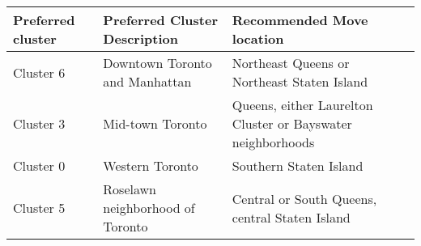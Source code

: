 \documentclass[11pt]{article}
\begin{document}
\begin{longtable}[]{@{}lll@{}}
\toprule
\begin{minipage}[b]{0.22\columnwidth}\raggedright\strut
Preferred cluster\strut
\end{minipage} & \begin{minipage}[b]{0.22\columnwidth}\raggedright\strut
Preferred Cluster Description\strut
\end{minipage} & \begin{minipage}[b]{0.22\columnwidth}\raggedright\strut
Recommended Move location\strut
\end{minipage}\tabularnewline
\midrule
\endhead
\begin{minipage}[t]{0.22\columnwidth}\raggedright\strut
Cluster 6\strut
\end{minipage} & \begin{minipage}[t]{0.22\columnwidth}\raggedright\strut
Downtown Toronto and Manhattan\strut
\end{minipage} & \begin{minipage}[t]{0.22\columnwidth}\raggedright\strut
Northeast Queens or Northeast Staten Island\strut
\end{minipage}\tabularnewline
\begin{minipage}[t]{0.22\columnwidth}\raggedright\strut
Cluster 3\strut
\end{minipage} & \begin{minipage}[t]{0.22\columnwidth}\raggedright\strut
Mid-town Toronto\strut
\end{minipage} & \begin{minipage}[t]{0.22\columnwidth}\raggedright\strut
Queens, either Laurelton Cluster or Bayswater neighborhoods\strut
\end{minipage}\tabularnewline
\begin{minipage}[t]{0.22\columnwidth}\raggedright\strut
Cluster 0\strut
\end{minipage} & \begin{minipage}[t]{0.22\columnwidth}\raggedright\strut
Western Toronto\strut
\end{minipage} & \begin{minipage}[t]{0.22\columnwidth}\raggedright\strut
Southern Staten Island\strut
\end{minipage}\tabularnewline
\begin{minipage}[t]{0.22\columnwidth}\raggedright\strut
Cluster 5\strut
\end{minipage} & \begin{minipage}[t]{0.22\columnwidth}\raggedright\strut
Roselawn neighborhood of Toronto\strut
\end{minipage} & \begin{minipage}[t]{0.22\columnwidth}\raggedright\strut
Central or South Queens, central Staten Island\strut
\end{minipage}\tabularnewline
\bottomrule
\end{longtable}
\end{document}
